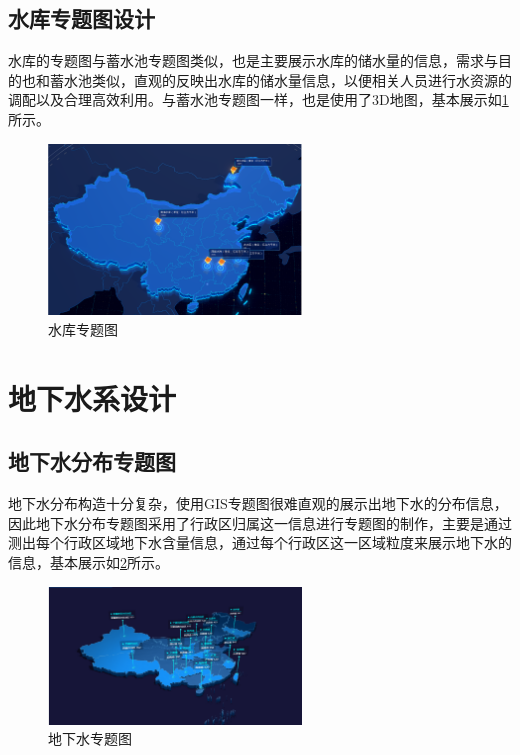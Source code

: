 \subsection{水库专题图设计}
水库的专题图与蓄水池专题图类似，也是主要展示水库的储水量的信息，需求与目的也和蓄水池类似，直观的反映出水库的储水量信息，以便相关人员进行水资源的调配以及合理高效利用。与蓄水池专题图一样，也是使用了3D地图，基本展示如\ref{fig:shuiku}所示。
\begin{figure}[!htb]%
	\centering
	\includegraphics[width=0.60\textwidth]{figs/shuiku.png}
	\caption{水库专题图}
	\label{fig:shuiku}
\end{figure}
\section{地下水系设计}
\subsection{地下水分布专题图}
地下水分布构造十分复杂，使用GIS专题图很难直观的展示出地下水的分布信息，因此地下水分布专题图采用了行政区归属这一信息进行专题图的制作，主要是通过测出每个行政区域地下水含量信息，通过每个行政区这一区域粒度来展示地下水的信息，基本展示如\ref{fig:dixiashui}所示。
\begin{figure}[!htb]%
	\centering
	\includegraphics[width=0.60\textwidth]{figs/dixiashui.png}
	\caption{地下水专题图}
	\label{fig:dixiashui}
\end{figure}
